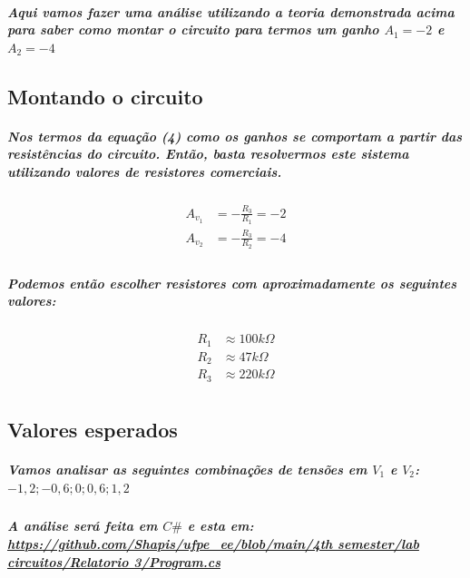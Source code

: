 \documentclass[12pt,twoside, a4paper, twocolumn]{article}
\begin{document}
\subparagraph*{Aqui vamos fazer uma análise utilizando a teoria demonstrada acima para saber como montar o circuito para termos um ganho $A_1 = -2$ e $A_2 = -4$}
\subsection{Montando o circuito}
\subparagraph*{Nos termos da equação (4) como os ganhos se comportam a partir das resistências do circuito. Então, basta resolvermos este sistema utilizando valores de resistores comerciais.}



\begin{equation}
    \begin{aligned}
        A_{v_1} & = -\frac{R_3}{R_1} = -2 \\
        A_{v_2} & = -\frac{R_3}{R_2} = -4 \\
    \end{aligned}
\end{equation}

\subparagraph*{Podemos então escolher resistores com aproximadamente os seguintes valores:}

\begin{equation}
    \begin{aligned}
        R_1 & \approx 100k \varOmega \\
        R_2 & \approx 47k \varOmega  \\
        R_3 & \approx 220k \varOmega \\
    \end{aligned}
\end{equation}

\subsection{Valores esperados}

\subparagraph*{Vamos analisar as seguintes combinações de tensões em $V_1$ e $V_2$: ${-1,2 ; -0,6 ; 0 ; 0,6 ; 1,2}$}

\subparagraph*{A análise será feita em $C\#$ e esta em: \url{https://github.com/Shapis/ufpe_ee/blob/main/4th semester/lab circuitos/Relatorio 3/Program.cs}}
\end{document}
